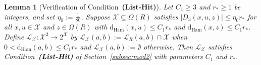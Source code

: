 \documentclass[11pt]{article}
\newtheorem{lemma}[theorem]{Lemma}
\theoremstyle{definition}
\theoremstyle{remark}
\newcommand{\Ham}{\mathrm{Ham}}
\newcommand{\dHam}{\mathrm{d}_{\Ham}}
\begin{document}
\begin{lemma}[Verification of Condition~\textbf{(List-Hit)}]
\label{lem:list-hit}
Let $C_1 \ge 3$ and $r_* \ge 1$ be integers, and set $\eta_0 := \frac{1}{80}$. Suppose $\mathcal{X} \subseteq \Omega(R)$ satisfies $|D_3(x, u, z)| \le \eta_0 r_*$ for all $x, u \in \mathcal{X}$ and $z \in \Omega(R)$ with $\dHam(x, u) \le C_1 r_*$ and $\dHam(x, z) \le C_1 r_*$. Define $\mathcal{L}_{\mathcal{X}} : \mathcal{X}^2 \to 2^{\mathcal{X}}$ by $\mathcal{L}_{\mathcal{X}}(a, b) := \mathcal{L}_R(a, b) \cap \mathcal{X}$ when $0 < \dHam(a, b) \le C_1 r_*$ and $\mathcal{L}_{\mathcal{X}}(a, b) := \emptyset$ otherwise. Then $\mathcal{L}_{\mathcal{X}}$ satisfies Condition~\textbf{(List-Hit)} of Section~\ref{subsec:mod2} with parameters $C_1$ and $r_*$.
\end{lemma}
\end{document}
